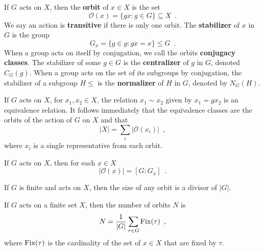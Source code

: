 \begin{definition} \cite[100]{Rotman1967} If $G$ acts on $X$, then the \textbf{orbit} of $x \in X$ is the set
$$\mathcal{O}(x) = \{ gx : g \in G \} \subseteq X \enspace.
$$
We say an action is \textbf{transitive} if there is only one orbit. The \textbf{stabilizer} of $x$ in $G$ is the group
$$
G_x = \{ g \in g : gx = x \} \leq G \enspace.
$$
When a group acts on itself by conjugation, we call the orbits \textbf{conjugacy classes}. The stabilizer of some $g \in G$ is the \textbf{centralizer} of $g$ in $G$, denoted $C_G(g)$. When a group acts on the set of its subgroups by conjugation, the stabilizer of a subgroup $H \leq$ is the \textbf{normalizer} of $H$ in $G$, denoted by $N_G(H)$.
\end{definition}

\begin{proposition} \cite[102]{Rotman1967} If $G$ acts on $X$, for $x_1, x_2 \in X$, the relation $x_1 \sim x_2$ given by $x_1 = gx_2$ is an equivalence relation. It follows immediately that the equivalence classes are the orbits of the action of $G$ on $X$ and that
$$
|X| = \sum_i |\mathcal{O}(x_i)| \enspace,
$$
where $x_i$ is a single representative from each orbit.
\end{proposition}

\begin{theorem} \cite[102]{Rotman1967} If $G$ acts on $X$, then for each $x \in X$
$$
|\mathcal{O}(x)| = [G : G_x] \enspace.
$$
\end{theorem}

\begin{corollary} \cite[103]{Rotman1967} If $G$ is finite and acts on $X$, then the size of any orbit is a divisor of $|G|$.
\end{corollary}

\begin{lemma}[Burnside] \cite[109]{Rotman1967} If $G$ acts on a finite set $X$, then the number of orbits $N$ is
$$
N = \frac{1}{|G|} \sum_{\tau \in G} \operatorname{Fix}(\tau) \enspace,
$$
where $\operatorname{Fix}(\tau)$ is the cardinality of the set of $x \in X$ that are fixed by $\tau$.
\end{lemma}


